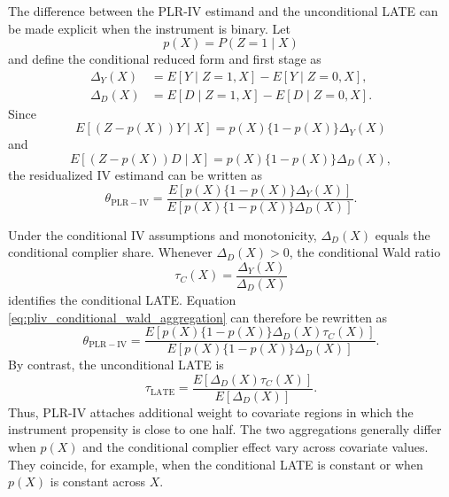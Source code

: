 \documentclass[12pt, a4paper, oneside]{article}
\theoremstyle{plain}
\theoremstyle{definition}
\begin{document}
The difference between the PLR-IV estimand and the unconditional LATE can be
made explicit when the instrument is binary. Let
\[
    p(X)=P(Z=1\mid X)
\]
and define the conditional reduced form and first stage as
\begin{align}
    \Delta_Y(X)
    &=
    E[Y\mid Z=1,X]-E[Y\mid Z=0,X],\\
    \Delta_D(X)
    &=
    E[D\mid Z=1,X]-E[D\mid Z=0,X].
\end{align}
Since
\[
E[(Z-p(X))Y\mid X]
=
p(X)\{1-p(X)\}\Delta_Y(X)
\]
and
\[
E[(Z-p(X))D\mid X]
=
p(X)\{1-p(X)\}\Delta_D(X),
\]
the residualized IV estimand can be written as
\begin{equation}
    \theta_{\mathrm{PLR-IV}}
    =
    \frac{E[p(X)\{1-p(X)\}\Delta_Y(X)]}
         {E[p(X)\{1-p(X)\}\Delta_D(X)]}.
    \label{eq:pliv_conditional_wald_aggregation}
\end{equation}

Under the conditional IV assumptions and monotonicity,
\(\Delta_D(X)\) equals the conditional complier share. Whenever
\(\Delta_D(X)>0\), the conditional Wald ratio
\[
    \tau_C(X)
    =
    \frac{\Delta_Y(X)}{\Delta_D(X)}
\]
identifies the conditional LATE. Equation
\eqref{eq:pliv_conditional_wald_aggregation} can therefore be rewritten as
\begin{equation}
    \theta_{\mathrm{PLR-IV}}
    =
    \frac{
      E[p(X)\{1-p(X)\}\Delta_D(X)\tau_C(X)]
    }{
      E[p(X)\{1-p(X)\}\Delta_D(X)]
    }.
\end{equation}
By contrast, the unconditional LATE is
\begin{equation}
    \tau_{\mathrm{LATE}}
    =
    \frac{
      E[\Delta_D(X)\tau_C(X)]
    }{
      E[\Delta_D(X)]
    }.
\end{equation}
Thus, PLR-IV attaches additional weight to covariate regions in which the
instrument propensity is close to one half. The two aggregations generally
differ when \(p(X)\) and the conditional complier effect vary across
covariate values. They coincide, for example, when the conditional LATE is
constant or when \(p(X)\) is constant across \(X\).
\end{document}

